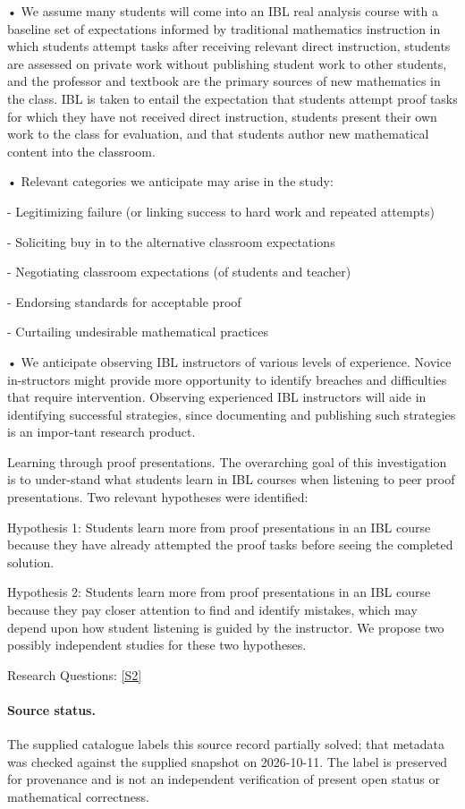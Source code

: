 \documentclass[11pt]{article}
\newcommand{\sref}[2]{\hyperlink{source:#1:#2}{[S#2]}}
\begin{document}
• We assume many students will come into an IBL real analysis course with a baseline set of expectations informed by traditional mathematics instruction in which students attempt tasks after receiving relevant direct instruction, students are assessed on private work without publishing student work to other students, and the professor and textbook are the primary sources of new mathematics in the class. IBL is taken to entail the expectation that students attempt proof tasks for which they have not received direct instruction, students present their own work to the class for evaluation, and that students author new mathematical content into the classroom.

• Relevant categories we anticipate may arise in the study:

- Legitimizing failure (or linking success to hard work and repeated attempts)

- Soliciting buy in to the alternative classroom expectations

- Negotiating classroom expectations (of students and teacher)

- Endorsing standards for acceptable proof

- Curtailing undesirable mathematical practices

• We anticipate observing IBL instructors of various levels of experience. Novice in-structors might provide more opportunity to identify breaches and difficulties that require intervention. Observing experienced IBL instructors will aide in identifying successful strategies, since documenting and publishing such strategies is an impor-tant research product.

Learning through proof presentations. The overarching goal of this investigation is to under-stand what students learn in IBL courses when listening to peer proof presentations. Two relevant hypotheses were identified:

Hypothesis 1: Students learn more from proof presentations in an IBL course because they have already attempted the proof tasks before seeing the completed solution.

Hypothesis 2: Students learn more from proof presentations in an IBL course because they pay closer attention to find and identify mistakes, which may depend upon how student listening is guided by the instructor. We propose two possibly independent studies for these two hypotheses.

Research Questions: \sref{statement}{2}
\paragraph{Source status.}
The supplied catalogue labels this source record partially solved; that metadata was checked against the supplied snapshot on 2026-10-11. The label is preserved for provenance and is not an independent verification of present open status or mathematical correctness.
\end{document}
